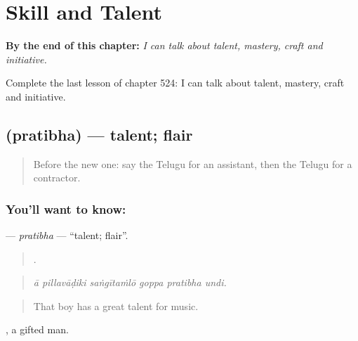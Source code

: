 
\chapter{Skill and Talent}
\label{ch:te-skill-and-talent}

\begin{chapteropening}
\textbf{By the end of this chapter:} \emph{I can talk about talent, mastery, craft and initiative.}

Complete the last lesson of chapter 524: I can talk about talent, mastery, craft and initiative.
\end{chapteropening}

\section[\texorpdfstring{\te{ప్రతిభ} (pratibha)}{ప్రతిభ (pratibha)}]{ (pratibha) — talent; flair}

\label{lesson:TE-C524-pratibha}



\begin{quote}
Before the new one: say the Telugu for an assistant, then the Telugu for a contractor.
\end{quote}

\subsection*{You'll want to know: }
\textbf{} — \emph{pratibha} — \textquotedblleft{}talent; flair\textquotedblright{}.

\begin{quote}
     .
\end{quote}

\begin{quote}
\emph{ā pillavāḍiki saṅgītaṁlō goppa pratibha undi.}
\end{quote}

\begin{quote}
That boy has a great talent for music.
\end{quote}

, a gifted man.

